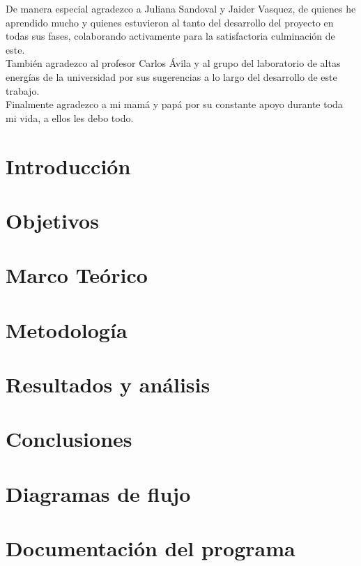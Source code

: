 \documentclass[12pt]{report}
\theoremstyle{definition}
\begin{document}
De manera especial agradezco a Juliana Sandoval y Jaider Vasquez, de quienes he aprendido mucho y quienes estuvieron al tanto del desarrollo del proyecto en todas sus fases, colaborando activamente para la satisfactoria culminación de este.\\

También agradezco al profesor Carlos \'Avila y al grupo del laboratorio de altas energías de la universidad por sus sugerencias a lo largo del desarrollo de este trabajo.\\

Finalmente agradezco a mi mamá y papá por su constante apoyo durante toda mi vida, a ellos les debo todo.  

\tableofcontents

\listoffigures

\chapter{Introducción}


\chapter{Objetivos}\label{chp:objetivos}


\chapter{Marco Teórico}\label{chp:teorico}


\chapter{Metodología}\label{chp:metodologia}


\chapter{Resultados y análisis}\label{chp:resultados}



\chapter{Conclusiones}


\begin{appendices}
	\chapter{Diagramas de flujo}
	
	\chapter{Documentación del programa}
	
\end{appendices}
\nocite{*}


\end{document}
